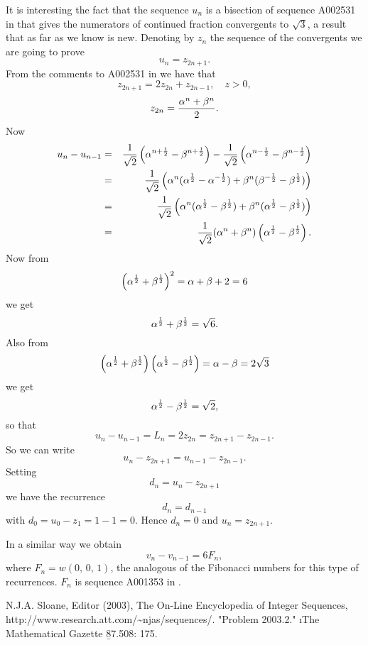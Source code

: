 \noindent
It is interesting the fact that the sequence $u_n$ is a bisection of
sequence A002531 in \cite{sloane} that gives the numerators of continued
fraction convergents to $\sqrt{3}$, a result that as far as we know is new.
Denoting by $z_n$ the sequence of the convergents we are going to prove
$$u_n=z_{2n+1}.$$
From the comments to A002531 in \cite{sloane} we have that
\begin{equation}
z_{2n+1}=2z_{2n}+z_{2n-1},\quad z>0,
\end{equation}
\begin{equation}
z_{2n}={\alpha^n+\beta^n\over 2}.
\end{equation}
Now
\begin{eqnarray*}
u_n-u_{n-1}&=&
{1\over \sqrt{2}}\left (\alpha^{n+{1\over 2}}-\beta^{n+{1\over 2}}\right )
-{1\over \sqrt{2}}\left (\alpha^{n-{1\over 2}}-\beta^{n-{1\over 2}}\right )\\
&=&
{1\over \sqrt{2}}\left (\alpha^n(\alpha^{1\over 2}-\alpha^{-{1\over 2}})+
\beta^n(\beta^{-{1\over 2}}-\beta^{1\over 2})\right )\\
&=&
{1\over \sqrt{2}}\left (\alpha^n(\alpha^{1\over 2}-\beta^{1\over 2})+
\beta^n(\alpha^{1\over 2}-\beta^{1\over 2})\right )\\
&=&
{1\over \sqrt{2}}(\alpha^n+\beta^n)\left (\alpha^{1\over 2}-\beta^{1\over 2}
\right ).
\end{eqnarray*}
Now from
$$\left (\alpha^{1\over 2}+\beta^{1\over 2}\right )^2=\alpha+\beta+2=6$$
we get
$$\alpha^{1\over 2}+\beta^{1\over 2}=\sqrt{6}.$$
Also from
$$\left (\alpha^{1\over 2}+\beta^{1\over 2}\right )
\left (\alpha^{1\over 2}-\beta^{1\over 2}\right )=\alpha-\beta=2\sqrt{3}$$
we get
$$\alpha^{1\over 2}-\beta^{1\over 2}=\sqrt{2},$$
so that
$$u_n-u_{n-1}=L_n=2z_{2n}=z_{2n+1}-z_{2n-1}.$$
So we can write
$$u_n-z_{2n+1}=u_{n-1}-z_{2n-1}.$$
Setting
$$d_n=u_n-z_{2n+1}$$
we have the recurrence
$$d_n=d_{n-1}$$
with $d_0=u_0-z_1=1-1=0$. Hence $d_n=0$ and $u_n=z_{2n+1}$.

\noindent
In a similar way we obtain
$$v_n-v_{n-1}=6F_n,$$
where $F_n=w(0,\,0,\,1)$, the analogous of the Fibonacci numbers for this
type of recurrences. $F_n$ is
sequence A001353 in \cite{sloane}.




\begin{thebibliography}{9}
N.J.A. Sloane, Editor (2003),
The On-Line Encyclopedia of Integer Sequences,
http://www.research.att.com/\~{}njas/sequences/.
"Problem 2003.2." \i{The Mathematical Gazette} \b{87}.508: 175.
\end{thebibliography}











